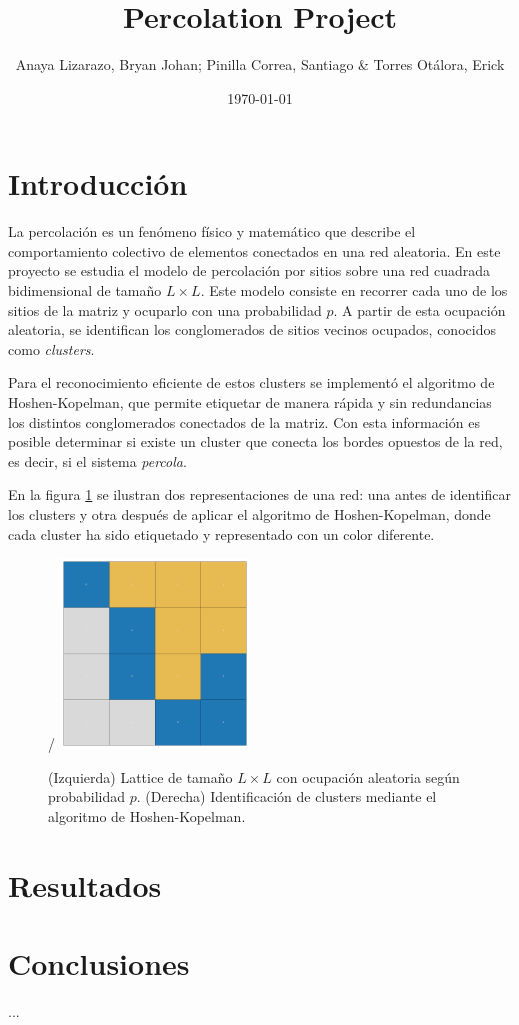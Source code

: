 \documentclass{article}
\title{Percolation Project}
\author{Anaya Lizarazo, Bryan Johan; Pinilla Correa, Santiago \& Torres Otálora, Erick}
\date{\today}
\begin{document}
 

\maketitle

\section{Introducción}

La percolación es un fenómeno físico y matemático que describe el comportamiento colectivo de elementos conectados en una red aleatoria. En este proyecto se estudia el modelo de percolación por sitios sobre una red cuadrada bidimensional de tamaño \( L \times L \). Este modelo consiste en recorrer cada uno de los sitios de la matriz y ocuparlo con una probabilidad \( p \). A partir de esta ocupación aleatoria, se identifican los conglomerados de sitios vecinos ocupados, conocidos como \emph{clusters}.

Para el reconocimiento eficiente de estos clusters se implementó el algoritmo de Hoshen-Kopelman, que permite etiquetar de manera rápida y sin redundancias los distintos conglomerados conectados de la matriz. Con esta información es posible determinar si existe un cluster que conecta los bordes opuestos de la red, es decir, si el sistema \emph{percola}.

En la figura \ref{fig:lattice_clusters} se ilustran dos representaciones de una red: una antes de identificar los clusters y otra después de aplicar el algoritmo de Hoshen-Kopelman, donde cada cluster ha sido etiquetado y representado con un color diferente.

\begin{figure}[h]
    \centering
    /%
    \hfill
    \includegraphics[width=0.45\textwidth]{figures/clusters.pdf}
    \caption{(Izquierda) Lattice de tamaño \( L \times L \) con ocupación aleatoria según probabilidad \( p \). (Derecha) Identificación de clusters mediante el algoritmo de Hoshen-Kopelman.}
    \label{fig:lattice_clusters}
\end{figure}
\section{Resultados}


\section{Conclusiones}
...
\end{document}
